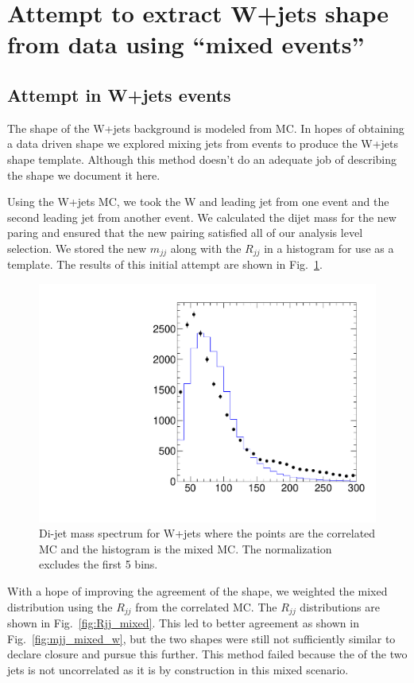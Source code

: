 \section{Attempt to extract W+jets shape from data using ``mixed events''}

\subsection{Attempt in W+jets events}

The shape of the W+jets background is modeled from MC.  In hopes of 
obtaining a data driven shape we explored mixing jets from events to 
produce the W+jets shape template.  Although this method doesn't do an 
adequate job of describing the shape we document it here.

Using the W+jets MC, we took the W and leading jet from one event
and the second leading jet from another event.  We calculated the dijet
mass for the new paring and ensured that the new pairing satisfied all 
of our analysis level selection.  We stored the new $m_{jj}$ along with 
the $R_{jj}$ in a histogram for use as a template.  The 
results of this initial attempt are shown in Fig.~\ref{fig:mjj_mixed}.

\begin{figure}[!h]
\begin{center}
\includegraphics[width=0.6\columnwidth]{figs/mixed_Mjj}
\end{center}
\caption{\label{fig:mjj_mixed}Di-jet mass spectrum for W+jets where
the points are the correlated MC and the histogram is the mixed MC.  The
normalization excludes the first 5 bins.}
\end{figure}

With a hope of improving the agreement of the shape, we weighted the 
mixed distribution using the $R_{jj}$ from the correlated MC.  The 
$R_{jj}$ distributions are shown in Fig.~\ref{fig:Rjj_mixed}.  This led 
to better agreement as shown in Fig.~\ref{fig:mjj_mixed_w}, but the two 
shapes were still not sufficiently similar to declare closure and pursue 
this further.  This method failed because the 
\pt of the two jets is not uncorrelated as it is by construction
in this mixed scenario.

